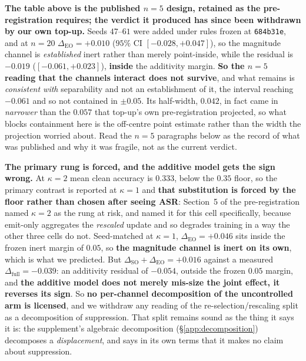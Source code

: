 \documentclass{article}
\begin{document}
\noindent \textbf{The table above is the published $n{=}5$ design, retained as the pre-registration requires; the verdict it produced has since been withdrawn by our own top-up.} Seeds $47$--$61$ were added under rules frozen at \texttt{684b31e}, and at $n{=}20$ $\Delta_{\mathrm{EO}} = +0.010$ ($95\%$ CI $[-0.028,+0.047]$), so the magnitude channel is \emph{established} inert rather than merely point-inside, while the residual is $-0.019$ ($[-0.061,+0.023]$), \textbf{inside} the additivity margin. \textbf{So the $n{=}5$ reading that the channels interact does not survive}, and what remains is \emph{consistent with} separability and not an establishment of it, the interval reaching $-0.061$ and so not contained in $\pm0.05$. Its half-width, $0.042$, in fact came in \emph{narrower} than the $0.057$ that top-up's own pre-registration projected, so what blocks containment here is the off-centre point estimate rather than the width the projection worried about. Read the $n{=}5$ paragraphs below as the record of what was published and why it was fragile, not as the current verdict.

\noindent \textbf{The primary rung is forced, and the additive model gets the sign wrong.} At $\kappa{=}2$ mean clean accuracy is $0.333$, below the $0.35$ floor, so the primary contrast is reported at $\kappa{=}1$ and \textbf{that substitution is forced by the floor rather than chosen after seeing ASR}: Section~5 of the pre-registration named $\kappa{=}2$ as the rung at risk, and named it for this cell specifically, because emit-only aggregates the \emph{rescaled} update and so degrades training in a way the other three cells do not. Seed-matched at $\kappa{=}1$, $\Delta_{\mathrm{EO}} = +0.046$ sits inside the frozen inert margin of $0.05$, so \textbf{the magnitude channel is inert on its own}, which is what we predicted. But $\Delta_{\mathrm{SO}} + \Delta_{\mathrm{EO}} = +0.016$ against a measured $\Delta_{\mathrm{full}} = -0.039$: an additivity residual of $-0.054$, outside the frozen $0.05$ margin, and \textbf{the additive model does not merely mis-size the joint effect, it reverses its sign}. So \textbf{no per-channel decomposition of the uncontrolled arm is licensed}, and we withdraw any reading of the re-selection/rescaling split as a decomposition of suppression. That split remains sound as the thing it says it is: the supplement's algebraic decomposition (§\ref{app:decomposition}) decomposes a \emph{displacement}, and says in its own terms that it makes no claim about suppression.
\end{document}
